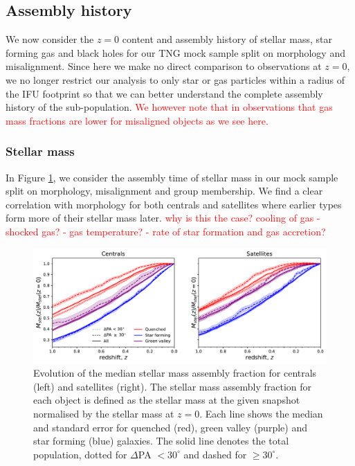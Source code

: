 \documentclass[fleqn,usenatbib]{mnras}
\newcommand{\red}[1]{{\textcolor{red}{#1}}}
\begin{document}
\subsection{Assembly history}
We now consider the $z = 0$ content and assembly history of stellar mass, star forming gas and black holes for our TNG mock sample split on morphology and misalignment. Since here we make no direct comparison to observations at $z = 0$, we no longer restrict our analysis to only star or gas particles within a radius of the IFU footprint so that we can better understand the complete assembly history of the sub-population. \red{We however note that in observations that gas mass fractions are lower for misaligned objects as we see here.}

\subsubsection{Stellar mass}
In Figure \ref{fig:stel_mass_evo}, we consider the assembly time of stellar mass in our mock sample split on morphology, misalignment and group membership. We find a clear correlation with morphology for both centrals and satellites where earlier types form more of their stellar mass later. \red{why is this the case? cooling of gas - shocked gas? - gas temperature? - rate of star formation and gas accretion?}

\begin{figure}
	\includegraphics[width=\linewidth]{tng_results/stel_mass_timestep_norm_cen_sat.pdf}
    \caption{Evolution of the median stellar mass assembly fraction for centrals (left) and satellites (right). The stellar mass assembly fraction for each object is defined as the stellar mass at the given snapshot normalised by the stellar mass at $z = 0$. Each line shows the median and standard error for quenched (red), green valley (purple) and star forming (blue) galaxies. The solid line denotes the total population, dotted for $\Delta$PA $< 30^{\circ}$ and dashed for $\geq 30^{\circ}$.}
    \label{fig:stel_mass_evo}
\end{figure}
\end{document}
